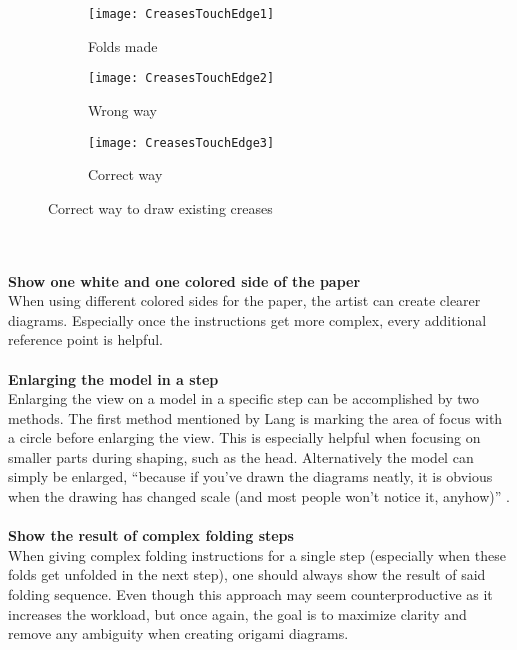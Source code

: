 \begin{figure*}[h]
    \centering
    \begin{subfigure}[b]{0.3\textwidth}
        \texttt{[image: CreasesTouchEdge1]}
        \caption{Folds made}
        \label{fig:creasesTouchEdge1}
    \end{subfigure}
    \begin{subfigure}[b]{0.3\textwidth}
        \texttt{[image: CreasesTouchEdge2]}
        \caption{Wrong way}
        \label{fig:creasesTouchEdge2}
    \end{subfigure}
    \begin{subfigure}[b]{0.3\textwidth}
        \texttt{[image: CreasesTouchEdge3]}
        \caption{Correct way}
        \label{fig:creasesTouchEdge3}
    \end{subfigure}
    \caption{Correct way to draw existing creases}\label{fig:creasesTouchEdge}
\end{figure*}\\
\\
\textbf{Show one white and one colored side of the paper}\\
When using different colored sides for the paper, the artist can create clearer diagrams. Especially once the instructions get more complex, every additional reference point is helpful.\\
\\
\textbf{Enlarging the model in a step}\\
Enlarging the view on a model in a specific step can be accomplished by two methods. The first method mentioned by Lang is marking the area of focus with a circle before enlarging the view. This is especially helpful when focusing on smaller parts during shaping, such as the head. Alternatively the model can simply be enlarged, \enquote{because if you've drawn the diagrams neatly, it is obvious when the drawing has changed scale (and most people won't notice it, anyhow)} \cite{Lang}.\\
 \\
 \textbf{Show the result of complex folding steps}\\
When giving complex folding instructions for a single step (especially when these folds get unfolded in the next step), one should always show the result of said folding sequence. Even though this approach may seem counterproductive as it increases the workload, but once again, the goal is to maximize clarity and remove any ambiguity when creating origami diagrams.\\
\\

